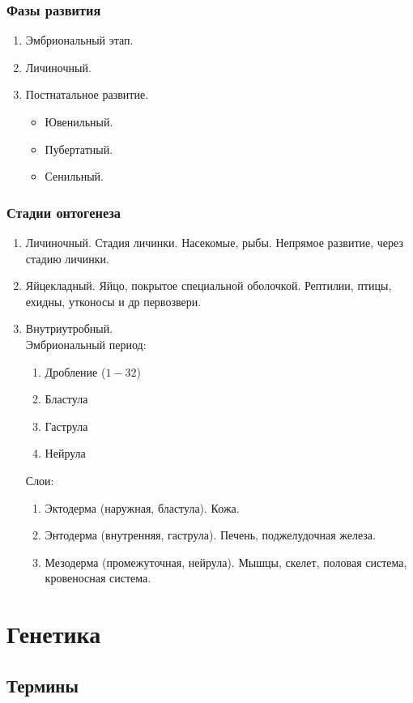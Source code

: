 \documentclass[12pt]{article}
\begin{document}
	\subsubsection{Фазы развития}
	\begin{enumerate}
		\item Эмбриональный этап.
		\item Личиночный.
		\item Постнатальное развитие.
		\begin{itemize}
			\item Ювенильный.
			\item Пубертатный.
			\item Сенильный.
		\end{itemize}
	\end{enumerate}
	\subsubsection{Стадии онтогенеза}
	\begin{enumerate}
		\item Личиночный. Стадия личинки. Насекомые, рыбы. Непрямое развитие, через стадию личинки.
		\item Яйцекладный. Яйцо, покрытое специальной оболочкой. Рептилии, птицы, ехидны, утконосы и др первозвери.
		\item Внутриутробный.\\
		Эмбриональный период:
		\begin{enumerate}
			\item Дробление ($1-32$)
			\item Бластула
			\item Гаструла
			\item Нейрула
		\end{enumerate}
		Слои:
		\begin{enumerate}
			\item Эктодерма (наружная, бластула). Кожа.
			\item Энтодерма (внутренняя, гаструла). Печень, поджелудочная железа.
			\item Мезодерма (промежуточная, нейрула). Мышцы, скелет, половая система, кровеносная система.
		\end{enumerate}
	\end{enumerate}
	\section{Генетика}
	
	\subsection{Термины}
	
\end{document}
